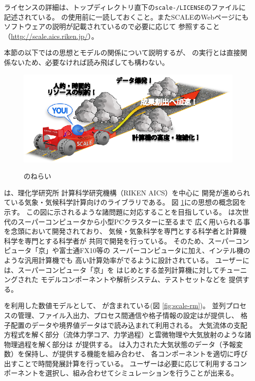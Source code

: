 ライセンスの詳細は、トップディレクトリ直下の\texttt{scale-\version/LICENSE}のファイルに記述されている。
\scalelib の使用前に一読しておくこと。またSCALEのWebページにもソフトウェアの説明が記載されているので必要に応じて
参照すること（\url{http://scale.aics.riken.jp/}）。

本節の以下では\scalelib の思想とモデルの関係について説明するが、
\scalerm の実行とは直接関係ないため、必要なければ読み飛ばしても構わない。


\begin{figure}[htb]
\begin{center}
  \includegraphics[width=0.9\hsize]{./figure/library.eps}\\
  \caption{\scalelib のねらい}
  \label{fig:scale}
\end{center}
\end{figure}

\scalelib は、理化学研究所 計算科学研究機構（RIKEN AICS）を中心に
開発が進められている気象・気候科学計算向けのライブラリである。
図 \ref{fig:scale}に\scalelib の思想の概念図を示す。
この図に示されるような諸問題に対応することを目指している。
\scalelib は次世代のスーパーコンピュータから小型PCクラスターに至るまで
広く用いられる事を念頭において開発されており、
気候・気象科学を専門とする科学者と計算機科学を専門とする科学者が
共同で開発を行っている。
そのため、スーパーコンピュータ「京」や富士通FX10等の
スーパーコンピュータに加え、インテル機のような汎用計算機でも
高い計算効率がでるように設計されている。
ユーザーには、スーパーコンピュータ「京」を
はじめとする並列計算機に対してチューニングされた
モデルコンポーネントや解析システム、テストセットなどを
提供する。

\scalelib を利用した数値モデルとして、
\scalerm が含まれている(図 \ref{fig:scale-rm})。
並列プロセスの管理、ファイル入出力、プロセス間通信や格子情報の設定は\scalelib が提供し、
格子配置のデータや境界値データは\scalelib で読み込まれて利用される。
大気流体の支配方程式を解く部分（流体力学コア、力学過程）と雲微物理や大気放射のような諸物理過程を解く部分は
\scalelib が提供する。
\scalerm は入力された大気状態のデータ（予報変数）を保持し、\scalelib が提供する機能を組み合わせ、
各コンポーネントを適切に呼び出すことで時間発展計算を行っている。
ユーザーは必要に応じて利用するコンポーネントを選択し、組み合わせてシミュレーションを行うことが出来る。

